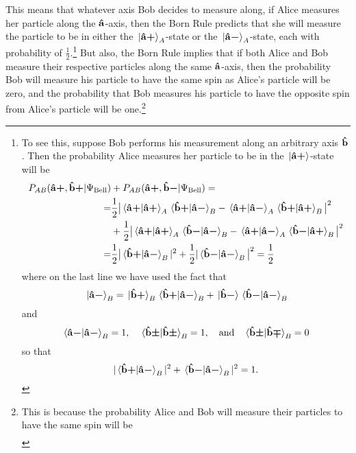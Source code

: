 This means that whatever axis Bob decides to measure along, if Alice measures her particle along the $\vb{\hat{{a}}}$-axis, then the Born Rule predicts that she will measure the particle to be in either the $\ket*{{\vb{\hat{{a}}}\bm{+}}}_A$-state or the $\ket*{{\vb{\hat{{a}}}\bm{-}}}_A$-state, each with probability of $\frac{1}{2}$.\footnote{To see this, suppose Bob performs his measurement along an arbitrary axis $\vb{\hat{{b}}}$. Then the probability Alice measures her particle to be in the $\ket*{{\vb{\hat{{a}}}\bm{+}}}$-state will be 
\begin{equation}
    \begin{split}
        P_{AB}(\uvbp{a}, \uvbp{b}|\Psi_{\text{Bell}})&+P_{AB}(\uvbp{a}, \uvbm{b}|\Psi_{\text{Bell}})= \\
        =&\frac{1}{2}\big| \ip*{\uvbp{a}}{\uvbp{a}}_A\ip*{\uvbp{b}}{\uvbm{a}}_B-\ip*{\uvbp{a}}{\uvbm{a}}_A\ip*{\uvbp{b}}{\uvbp{a}}_B\big|^2\\
        &+\frac{1}{2}\big|\ip*{\uvbp{a}}{\uvbp{a}}_A\ip*{\uvbm{b}}{\uvbm{a}}_B-\ip*{\uvbp{a}}{\uvbm{a}}_A\ip*{\uvbm{b}}{\uvbp{a}}_B\big|^2\\
        =&\frac{1}{2}\big|\ip*{\uvbp{b}}{\uvbm{a}}_B|^2+\frac{1}{2}|\ip*{\uvbm{b}}{\uvbm{a}}_B\big|^2=\frac{1}{2}
    \end{split}
\end{equation} 
where on the last line we have used the fact that 
\begin{equation*}
\ket*{\uvbm{a}}_B=\ket*{\uvbp{b}}_B\ip*{\uvbp{b}}{\uvbm{a}}_B+\ket*{\uvbm{b}}\ip*{\uvbm{b}}{\uvbm{a}}_B
\end{equation*}
and 
\begin{equation*}
\ip*{\uvbm{a}}{\uvbm{a}}_B=1,\quad\ip*{\uvbpm{b}}{\uvbpm{b}}_B=1,\quad\text{and}\quad \ip*{\uvbpm{b}}{\uvbmp{b}}_B=0
\end{equation*}
so that 
\begin{equation*}
|\ip*{\uvbp{b}}{\uvbm{a}}_B|^2+\ip*{\uvbm{b}}{\uvbm{a}}_B|^2=1.
\end{equation*}
} But also, the Born Rule implies that if both Alice and Bob measure their respective particles along the same $\vb{\hat{{a}}}$-axis, then the probability Bob will measure his particle to have the same spin as Alice's particle will be zero, and the probability that Bob measures his particle to have the opposite spin from Alice's particle will be one.\footnote{This is because the probability Alice and Bob will measure their particles to have the same spin will be 
\begin{equation*}
\begin{split}

\end{split}
\end{equation*}}
